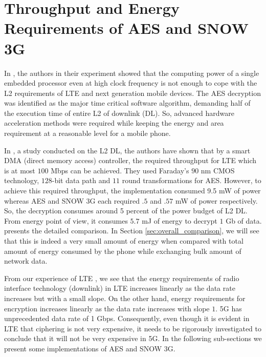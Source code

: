 \documentclass[lnicst,sechang,a4paper]{svmultln}
\begin{document}
\section{Throughput and Energy Requirements of AES and SNOW 3G}
\label{sec:throughput_and_energy_requirements_of_aes_snow3g}
In \cite{IIS_Ruhr_2009}, the authors in their experiment showed that the computing power of a single embedded processor even at high clock frequency is not enough to cope with the L2 requirements of LTE and next generation mobile devices. The AES decryption was identified as the major time critical software algorithm, demanding half of the execution time of entire L2 of downlink (DL). So, advanced hardware acceleration methods were required while keeping the energy and area requirement at a reasonable level for a mobile phone.

In \cite{IIS_Ruhr_2010}, a study conducted on the L2 DL, the authors have shown that by a smart DMA (direct memory access) controller, the required throughput for LTE which is at most $100$ Mbps can be achieved. They used Faraday's $90$ nm CMOS technology, $128$-bit data path and $11$ round transformations for AES. However, to achieve this required throughput, the implementation consumed 9.5 mW of power whereas AES and SNOW 3G each required $.5$ and $.57$ mW of power respectively. So, the decryption consumes around 5 percent of the power budget of L2 DL. From energy point of view, it consumes $5.7$ mJ of energy to decrypt $1$ Gb of data. \cite[Figure 6]{IIS_Ruhr_2010} presents the detailed comparison. In Section \ref{sec:overall_comparison}, we will see that this is indeed a very small amount of energy when compared with total amount of energy consumed by the phone while exchanging bulk amount of network data.

From our experience of LTE \cite[Fig 9]{Mobisys_2012}, we see that the energy requirements of radio interface technology (downlink) in LTE increases linearly as the data rate increases but with a small slope. On the other hand, energy requirements for encryption increases linearly as the data rate increases with slope $1$. 5G has unprecedented data rate of 1 Gbps. Consequently, even though it is evident in LTE that ciphering is not very expensive, it needs to be rigorously investigated to conclude that it will not be very expensive in 5G. In the following sub-sections we present some implementations of AES and SNOW 3G.
\end{document}
